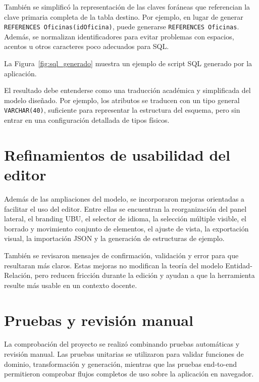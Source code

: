También se simplificó la representación de las claves foráneas que referencian la clave primaria completa de la tabla destino. Por ejemplo, en lugar de generar \texttt{REFERENCES Oficinas(idOficina)}, puede generarse \texttt{REFERENCES Oficinas}. Además, se normalizan identificadores para evitar problemas con espacios, acentos u otros caracteres poco adecuados para SQL.

La Figura~\ref{fig:sql_generado} muestra un ejemplo de script SQL generado por la aplicación.


El resultado debe entenderse como una traducción académica y simplificada del modelo diseñado. Por ejemplo, los atributos se traducen con un tipo general \texttt{VARCHAR(40)}, suficiente para representar la estructura del esquema, pero sin entrar en una configuración detallada de tipos físicos.

\section{Refinamientos de usabilidad del editor}

Además de las ampliaciones del modelo, se incorporaron mejoras orientadas a facilitar el uso del editor. Entre ellas se encuentran la reorganización del panel lateral, el branding UBU, el selector de idioma, la selección múltiple visible, el borrado y movimiento conjunto de elementos, el ajuste de vista, la exportación visual, la importación JSON y la generación de estructuras de ejemplo.

También se revisaron mensajes de confirmación, validación y error para que resultaran más claros. Estas mejoras no modifican la teoría del modelo Entidad-Relación, pero reducen fricción durante la edición y ayudan a que la herramienta resulte más usable en un contexto docente.

\section{Pruebas y revisión manual}

La comprobación del proyecto se realizó combinando pruebas automáticas y revisión manual. Las pruebas unitarias se utilizaron para validar funciones de dominio, transformación y generación, mientras que las pruebas end-to-end permitieron comprobar flujos completos de uso sobre la aplicación en navegador.

